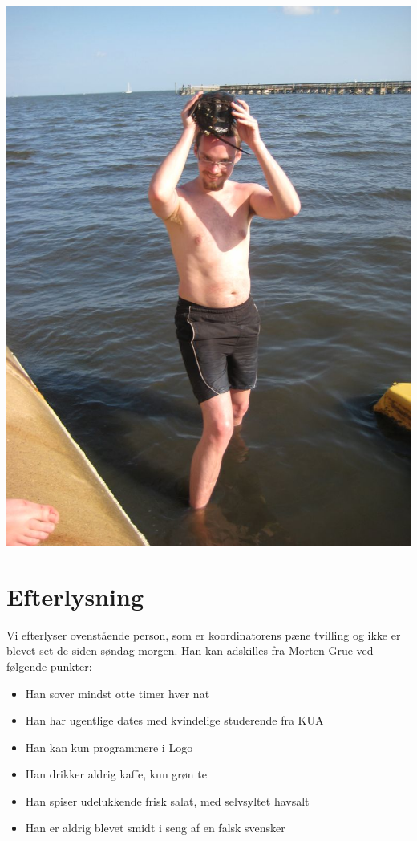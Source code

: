 \begin{minipage}[b]{0.95\linewidth}
\begin{minipage}[t]{0.47\textwidth}
\includegraphics[width=\linewidth]{sexygrue.jpg}

\section*{Efterlysning}

Vi efterlyser ovenstående person, som er koordinatorens pæne tvilling og ikke er blevet set de siden søndag morgen. Han kan adskilles fra Morten Grue ved følgende punkter:
\begin{itemize}
\item Han sover mindst otte timer hver nat
\item Han har ugentlige dates med kvindelige studerende fra KUA
\item Han kan kun programmere i Logo
\item Han drikker aldrig kaffe, kun grøn te
\item Han spiser udelukkende frisk salat, med selvsyltet havsalt
\item Han er aldrig blevet smidt i seng af en falsk svensker
\end{itemize}

\end{minipage}
\end{minipage}

